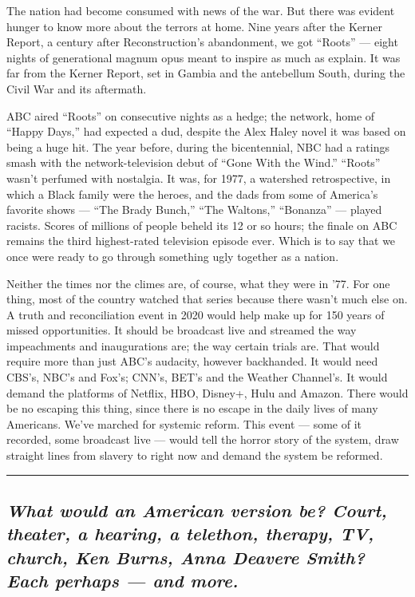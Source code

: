 The nation had become consumed with news of the war. But there was
evident hunger to know more about the terrors at home. Nine years after
the Kerner Report, a century after Reconstruction's abandonment, we got
``Roots'' --- eight nights of generational magnum opus meant to inspire
as much as explain. It was far from the Kerner Report, set in Gambia and
the antebellum South, during the Civil War and its aftermath.

ABC aired ``Roots'' on consecutive nights as a hedge; the network, home
of ``Happy Days,'' had expected a dud, despite the Alex Haley novel it
was based on being a huge hit. The year before, during the bicentennial,
NBC had a ratings smash with the network-television debut of ``Gone With
the Wind.'' ``Roots'' wasn't perfumed with nostalgia. It was, for 1977,
a watershed retrospective, in which a Black family were the heroes, and
the dads from some of America's favorite shows --- ``The Brady Bunch,''
``The Waltons,'' ``Bonanza'' --- played racists. Scores of millions of
people beheld its 12 or so hours; the finale on ABC remains the third
highest-rated television episode ever. Which is to say that we once were
ready to go through something ugly together as a nation.

Neither the times nor the climes are, of course, what they were in '77.
For one thing, most of the country watched that series because there
wasn't much else on. A truth and reconciliation event in 2020 would help
make up for 150 years of missed opportunities. It should be broadcast
live and streamed the way impeachments and inaugurations are; the way
certain trials are. That would require more than just ABC's audacity,
however backhanded. It would need CBS's, NBC's and Fox's; CNN's, BET's
and the Weather Channel's. It would demand the platforms of Netflix,
HBO, Disney+, Hulu and Amazon. There would be no escaping this thing,
since there is no escape in the daily lives of many Americans. We've
marched for systemic reform. This event --- some of it recorded, some
broadcast live --- would tell the horror story of the system, draw
straight lines from slavery to right now and demand the system be
reformed.

\begin{center}\rule{0.5\linewidth}{\linethickness}\end{center}

\hypertarget{what-would-an-american-version-be-court-theater-a-hearing-a-telethon-therapy-tv-church-ken-burns-anna-deavere-smith-each-perhaps--and-more}{%
\subsection{\texorpdfstring{\emph{What would an American version be?
Court, theater, a hearing, a telethon, therapy, TV, church, Ken Burns,
Anna Deavere Smith? Each perhaps --- and
more.}}{What would an American version be? Court, theater, a hearing, a telethon, therapy, TV, church, Ken Burns, Anna Deavere Smith? Each perhaps --- and more.}}\label{what-would-an-american-version-be-court-theater-a-hearing-a-telethon-therapy-tv-church-ken-burns-anna-deavere-smith-each-perhaps--and-more}}

